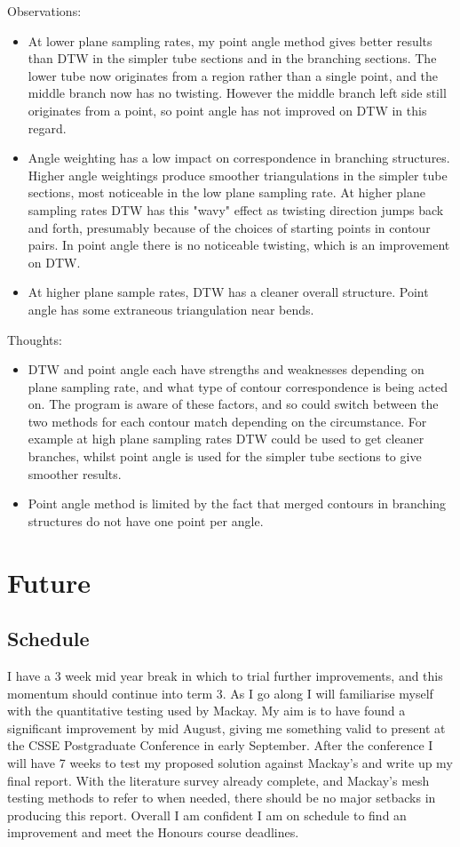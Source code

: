 \documentclass[10pt]{article}
\begin{document}
Observations:
\begin{itemize}
\item At lower plane sampling rates, my point angle method gives better results than DTW in the simpler tube sections and in the branching sections. The lower tube now originates from a region rather than a single point, and the middle branch now has no twisting. However the middle branch left side still originates from a point, so point angle has not improved on DTW in this regard.
\item Angle weighting has a low impact on correspondence in branching structures. Higher angle weightings produce smoother triangulations in the simpler tube sections, most noticeable in the low plane sampling rate. At higher plane sampling rates DTW has this "wavy" effect as twisting direction jumps back and forth, presumably because of the choices of starting points in contour pairs. In point angle there is no noticeable twisting, which is an improvement on DTW.
\item At higher plane sample rates, DTW has a cleaner overall structure. Point angle has some extraneous triangulation near bends.
\end{itemize}

Thoughts:
\begin{itemize}
\item DTW and point angle each have strengths and weaknesses depending on plane sampling rate, and what type of contour correspondence is being acted on. The program is aware of these factors, and so could switch between the two methods for each contour match depending on the circumstance. For example at high plane sampling rates DTW could be used to get cleaner branches, whilst point angle is used for the simpler tube sections to give smoother results.
\item Point angle method is limited by the fact that merged contours in branching structures do not have one point per angle.
\end{itemize}

\section{Future}

\subsection{Schedule}

I have a 3 week mid year break in which to trial further improvements, and this momentum should continue into term 3. As I go along I will familiarise myself with the quantitative testing used by Mackay. My aim is to have found a significant improvement by mid August, giving me something valid to present at the CSSE Postgraduate Conference in early September. After the conference I will have 7 weeks to test my proposed solution against Mackay's and write up my final report. With the literature survey already complete, and Mackay's mesh testing methods to refer to when needed, there should be no major setbacks in producing this report. Overall I am confident I am on schedule to find an improvement and meet the Honours course deadlines.
\end{document}

